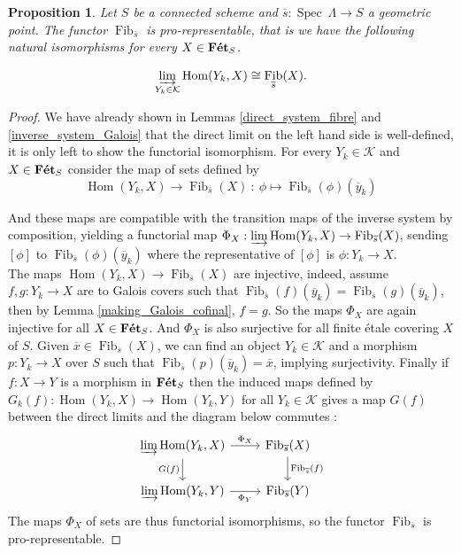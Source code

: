 \documentclass{article}
\theoremstyle{plain}
\newtheorem{proposition}[theorem]{Proposition}
\theoremstyle{definition}
\DeclareMathOperator{\Hom}{Hom}
\DeclareMathOperator{\Fib}{Fib}
\DeclareMathOperator{\Spec}{Spec}
\DeclareMathOperator{\Fet}{\bf{F\acute{e}t}}
\begin{document}
\begin{proposition}
\label{fib_pro_representable}
    Let $S$ be a connected scheme and $\overline{s}:\Spec\:\Lambda \rightarrow S$ a geometric point. The functor $\Fib_{\overline{s}}$ is pro-representable, that is we have the following natural isomorphisms for every $X\in \Fet_S$.

    $$\varinjlim_{Y_k\in\mathcal{K}} \Hom(Y_k,X) \cong \Fib_{\overline{s}}(X).$$
\end{proposition}
\begin{proof}
    We have already shown in Lemmas \ref{direct_system_fibre} and \ref{inverse_system_Galois} that the direct limit on the left hand side is well-defined, it is only left to show the functorial isomorphism.
    For every $Y_k\in\mathcal{K}$ and $X\in \Fet_S$ consider the map of sets defined by 
    $$\Hom(Y_k, X) \rightarrow \Fib_{\overline{s}}(X) \: : \:\phi\mapsto\Fib_{\overline{s}}(\phi)(\overline{y}_k)$$
    
    \noindent And these maps are compatible with the transition maps of the inverse system by composition, yielding a functorial map $\Phi_X :\varinjlim\Hom(Y_k, X) \rightarrow \Fib_{\overline{s}}(X)$, sending $[\phi]$ to $\Fib_{\overline{s}}(\phi)(\overline{y}_k)$ where the representative of $[\phi]$ is $\phi:Y_k\rightarrow X$.\\
    The maps $\Hom(Y_k,X) \rightarrow \Fib_{\overline{s}}(X)$ are injective, indeed, assume $f,g:Y_k\rightarrow X$ are to Galois covers such that $\Fib_{\overline{s}}(f)(\overline{y}_k) = \Fib_{\overline{s}}(g)(\overline{y}_k)$, then by Lemma \ref{making_Galois_cofinal}, $f=g$.
    So the maps $\Phi_X$ are again injective for all $X\in\Fet_S$.
    And $\Phi_X$ is also surjective for all finite \'etale covering $X$ of $S$. Given $\overline{x}\in\Fib_{\overline{s}}(X)$, we can find an object $Y_k\in \mathcal{K}$ and a morphism $p:Y_k\rightarrow X$ over $S$ such that $\Fib_{\overline{s}}(p)(\overline{y}_k) = \overline{x}$, implying surjectivity.
    Finally if $f:X\rightarrow Y$ is a morphism in $\Fet_S$ then the induced maps defined by $G_k(f):\Hom(Y_k,X)\rightarrow\Hom(Y_k,Y)$ for all $Y_k\in \mathcal{K}$ gives a map $G(f)$ between the direct limits and the diagram below commutes :
    \[
    \begin{tikzcd}
        \varinjlim \Hom(Y_k,X) \arrow[r,"\Phi_X"] \arrow[d, "G(f)"'] & \Fib_{\overline{s}}(X) \arrow[d,"\Fib_{\overline{s}}(f)"] \\
        \varinjlim \Hom(Y_k,Y) \arrow[r,"\Phi_Y"'] &  \Fib_{\overline{s}}(Y)
    \end{tikzcd}
    \]
    The maps $\Phi_X$ of sets are thus functorial isomorphisms, so the functor $\Fib_{\overline{s}}$ is pro-representable. 
\end{proof}
\end{document}
